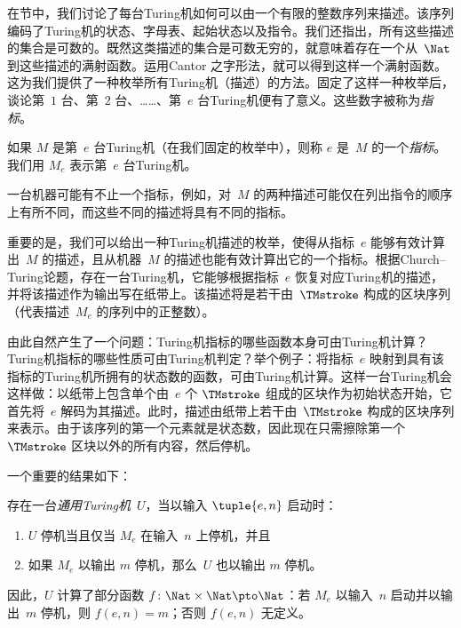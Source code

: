 \documentclass[../../../include/open-logic-section]{subfiles}
\begin{document}

在节中，我们讨论了每台Turing机如何可以由一个有限的整数序列来描述。该序列编码了Turing机的状态、字母表、起始状态以及指令。我们还指出，所有这些描述的集合是可数的。既然这类描述的集合是可数无穷的，就意味着存在一个从~$\Nat$ 到这些描述的满射函数。运用Cantor 之字形法，就可以得到这样一个满射函数。这为我们提供了一种枚举所有Turing机（描述）的方法。固定了这样一种枚举后，谈论第~$1$ 台、第~$2$ 台、……、第~$e$ 台Turing机便有了意义。这些数字被称为\emph{指标}。

\begin{defn}
如果 $M$ 是第~$e$ 台Turing机（在我们固定的枚举中），则称 $e$ 是~$M$ 的一个\emph{指标}。我们用 $M_e$ 表示第~$e$ 台Turing机。
\end{defn}

一台机器可能有不止一个指标，例如，对~$M$ 的两种描述可能仅在列出指令的顺序上有所不同，而这些不同的描述将具有不同的指标。

重要的是，我们可以给出一种Turing机描述的枚举，使得从指标~$e$ 能够有效计算出~$M$ 的描述，且从机器~$M$ 的描述也能有效计算出它的一个指标。根据Church--Turing论题，存在一台Turing机，它能够根据指标~$e$ 恢复对应Turing机的描述，并将该描述作为输出写在纸带上。该描述将是若干由~$\TMstroke$ 构成的区块序列（代表描述~$M_e$ 的序列中的正整数）。

由此自然产生了一个问题：Turing机指标的哪些函数本身可由Turing机计算？Turing机指标的哪些性质可由Turing机判定？举个例子：将指标~$e$ 映射到具有该指标的Turing机所拥有的状态数的函数，可由Turing机计算。这样一台Turing机会这样做：以纸带上包含单个由~$e$ 个 $\TMstroke$ 组成的区块作为初始状态开始，它首先将~$e$ 解码为其描述。此时，描述由纸带上若干由~$\TMstroke$ 构成的区块序列来表示。由于该序列的第一个元素就是状态数，因此现在只需擦除第一个 $\TMstroke$ 区块以外的所有内容，然后停机。

一个重要的结果如下：

\begin{thm} 存在一台\emph{通用Turing机}~$U$，当以输入 $\tuple{e,n}$ 启动时：
  \begin{enumerate}
    \item $U$ 停机当且仅当 $M_e$ 在输入~$n$ 上停机，并且
    \item 如果 $M_e$ 以输出 $m$ 停机，那么~$U$ 也以输出 $m$ 停机。
  \end{enumerate}
  因此，$U$ 计算了部分函数 $f\colon \Nat \times \Nat \pto \Nat$：若 $M_e$ 以输入~$n$ 启动并以输出~$m$ 停机，则 $f(e,n) = m$；否则 $f(e,n)$ 无定义。
\end{thm}
\end{document}
